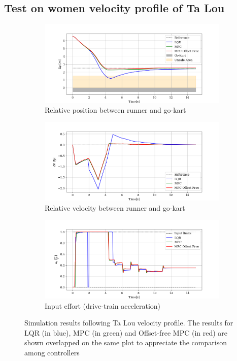 \documentclass[a4paper,12pt,oneside]{book}
\begin{document}
\subsection{Test on women velocity profile of Ta Lou}
\begin{figure}[h!]
    \centering
    \begin{subfigure}[t]{0.8\textwidth}
        \includegraphics[width=\textwidth]{Ta_Lou/Deltap.png}
        \caption{Relative position between runner and go-kart}
        \label{fig:Deltapwomen}
    \end{subfigure}
    
    \begin{subfigure}[t]{0.8\textwidth}
        \includegraphics[width=\textwidth]{Ta_Lou/Deltav.png}
        \caption{Relative velocity between runner and go-kart}
        \label{fig:Deltavwomen}
    \end{subfigure}
    
    \begin{subfigure}[t]{0.8\textwidth}
        \includegraphics[width=\textwidth]{Ta_Lou/Input.png}
        \caption{Input effort (drive-train acceleration)}
        \label{fig:Inputwomen}
    \end{subfigure}
    \caption{Simulation results following Ta Lou velocity profile. The results for LQR (in blue), MPC (in green) and Offset-free MPC (in red) are shown overlapped on the same plot to appreciate the comparison among controllers}
    \label{fig:Women}
\end{figure}
\end{document}
